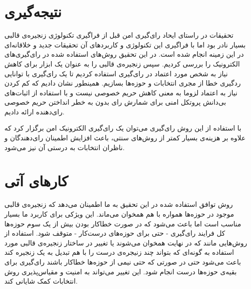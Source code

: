 \section{نتیجه‌گیری}
تحقیقات در راستای ایحاد رای‌گیری امن قبل از فراگیری تکنولوژی زنجیره‌ی قالبی بسیار نادر بود اما با فراگیری این تکنولوژی و کاربرد‌های آن تحقیقات جدید و خلاقانه‌ای در این زمینه انجام شده است. در این تحقیق روش‌های استفاده شده در رای‌گیری‌های الکترونیک را بررسی کردیم. سپس زنجیره‌ی قالبی را به عنوان یک ابزار برای کاهش نیاز به شخص مورد اعتماد در رای‌گیری استفاده کردیم تا یک رای‌گیری با توانایی ردگیری خطا از مجری انتخابات و حوزه‌ها بسازیم. همینطور نشان دادیم که کم کردن نیاز به اعتماد لزوما به معنی کاهش حریم خصوصی نیست و با استفاده از اثبات‌های بی‌دانش پروتکل‌ امنی برای شمارش رای بدون به خطر انداختن حریم خصوصی رای‌دهنده ارائه دادیم. 
\par 
با استفاده از این روش رای‌گیری می‌توان یک رای‌گیری الکترونیک امن برگزار کرد که علاوه بر هزینه‌ی بسیار کمتر از روش‌های سنتی، باعث افزایش اطمینان رای‌دهندگان و ناظران انتخابات به درستی آن نیز می‌شود. 

\section{کار‌های آتی} 
روش توافق استفاده شده در این تحقیق به ما اطمینان می‌دهد که زنجیره‌ی قالبی موجود در حوزه‌ها همواره با هم همخوان می‌ماند. این ویژکی برای کاربرد ما بسیار مناسب است اما باعث می‌شود که در صورت خطاکار بودن بیش از یک سوم حوزه‌‌ها کل فرایند رای‌گیری - حتی برای حوزه‌های درست‌کار - متوقف شود. استفاده از روش‌هایی مانند  که در نهایت همخوان می‌شوند یا تغییر در ساختار زنجیره‌ی قالبی مورد استفاده به گونه‌ای که بتواند چند زنیجره‌ی درست را با هم تبدیل به یک زنجیره کند باعث می‌شود حتی در صورتی که  حتی نیمی از حوزه‌ها خطاکار باشند رای‌گیری برای بقیه‌ی حوزه‌ها درست انجام شود. این تغییر می‌تواند به امنیت و مقیاس‌پذیری روش انتخابات کمک شایانی کند. 





